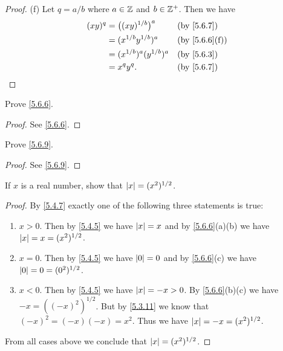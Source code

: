 \begin{proof}{(f)}
  Let \(q = a / b\) where \(a \in \mathbb{Z}\) and \(b \in \mathbb{Z}^+\).
  Then we have
  \begin{align*}
    (xy)^q & = \big((xy)^{1 / b}\big)^a    &  & \by{5.6.7}    \\
           & = (x^{1 / b} y^{1 / b})^a     &  & \by{5.6.6}[f] \\
           & = (x^{1 / b})^a (y^{1 / b})^a &  & \by{5.6.3}    \\
           & = x^q y^q.                    &  & \by{5.6.7}
  \end{align*}
\end{proof}

\exercisesection

\begin{ex}\label{ex:5.6.1}
  Prove \cref{5.6.6}.
\end{ex}

\begin{proof}
  See \cref{5.6.6}.
\end{proof}

\begin{ex}\label{ex:5.6.2}
  Prove \cref{5.6.9}.
\end{ex}

\begin{proof}
  See \cref{5.6.9}.
\end{proof}

\begin{ex}\label{ex:5.6.3}
  If \(x\) is a real number, show that \(\left\lvert x\right\rvert = (x^2)^{1 / 2}\).
\end{ex}

\begin{proof}
  By \cref{5.4.7} exactly one of the following three statements is true:
  \begin{enumerate}
    \item \(x > 0\).
          Then by \cref{5.4.5} we have \(\left\lvert x\right\rvert = x\) and by \cref{5.6.6}(a)(b) we have \(\left\lvert x\right\rvert = x = (x^2)^{1 / 2}\).
    \item \(x = 0\).
          Then by \cref{5.4.5} we have \(\left\lvert0\right\rvert = 0\) and by \cref{5.6.6}(c) we have \(\left\lvert0\right\rvert = 0 = (0^2)^{1 / 2}\).
    \item \(x < 0\).
          Then by \cref{5.4.5} we have \(\left\lvert x\right\rvert = -x > 0\).
          By \cref{5.6.6}(b)(c) we have \(-x = ((-x)^2)^{1 / 2}\).
          But by \cref{5.3.11} we know that \((-x)^2 = (-x)(-x) = x^2\).
          Thus we have \(\left\lvert x\right\rvert = -x = (x^2)^{1 / 2}\).
  \end{enumerate}
  From all cases above we conclude that \(\left\lvert x\right\rvert = (x^2)^{1 / 2}\).
\end{proof}

